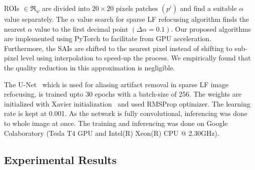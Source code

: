 ROIs $\in \mathfrak{R}_{w}$ are divided into $20\times20$ pixels patches $(p^i)$ and find a suitable $\alpha$ value separately. The $\alpha$ value search for sparse LF refocusing algorithm finds the nearest $\alpha$ value to the first decimal point $(\Delta\alpha=0.1)$.
Our proposed algorithms are implemented using PyTorch to facilitate from GPU acceleration. Furthermore, the SAIs are shifted to the nearest pixel instead of shifting to sub-pixel level using interpolation to speed-up the process. We empirically found that the quality reduction in this approximation is negligible. 

The U-Net~\cite{unet} which is used for aliasing artifact removal in sparse LF image refocusing, is trained upto 30 epochs with a batch-size of 256. The weights are initialized with Xavier initialization~\cite{xavier} and used RMSProp optimizer. The learning rate is kept at 0.001.
As the network is fully convolutional, inferencing was done to whole image at once. The training and inferencing was done on Google Colaboratory (Tesla T4 GPU and Intel(R) Xeon(R) CPU @ 2.30GHz).

\subsection{Experimental Results}

